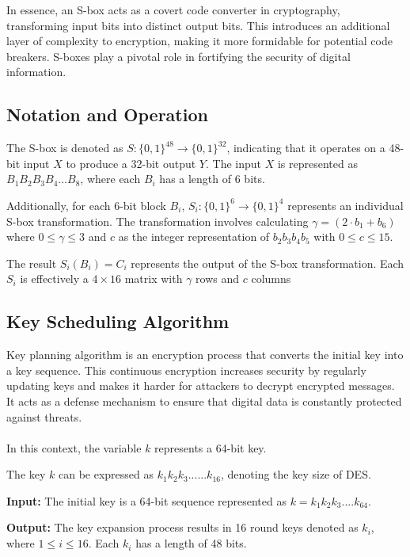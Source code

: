 \documentclass[11pt]{article}
\begin{document}
In essence, an S-box acts as a covert code converter in cryptography, transforming input bits into distinct output bits. This introduces an additional layer of complexity to encryption, making it more formidable for potential code breakers. S-boxes play a pivotal role in fortifying the security of digital information.

\subsection{Notation and Operation}

The S-box is denoted as \(S: \{0, 1\}^{48} \rightarrow \{0, 1\}^{32}\), indicating that it operates on a 48-bit input \(X\) to produce a 32-bit output \(Y\). The input \(X\) is represented as \(B_1B_2B_3B_4 \ldots B_8\), where each \(B_i\) has a length of 6 bits.

Additionally, for each 6-bit block \(B_i\), \(S_i: \{0, 1\}^6 \rightarrow \{0, 1\}^4\) represents an individual S-box transformation. The transformation involves calculating \(\gamma = (2 \cdot b_1 + b_6)\) where \(0 \leq \gamma \leq 3\) and \(c\) as the integer representation of \(b_2b_3b_4b_5\) with \(0 \leq c \leq 15\).

The result \(S_i(B_i) = C_i\) represents the output of the S-box transformation. Each \(S_i\) is effectively a \(4 \times 16\) matrix with \(\gamma\) rows and \(c\) columns

\subsection{Key Scheduling Algorithm}

Key planning algorithm is an encryption process that converts the initial key into a key sequence. This continuous encryption increases security by regularly updating keys and makes it harder for attackers to decrypt encrypted messages. It acts as a defense mechanism to ensure that digital data is constantly protected against threats.\\\\

In this context, the variable $k$ represents a 64-bit key.

The key $k$ can be expressed as $k_1 k_2 k_3......k_{16}$, denoting the key size of DES.

\textbf{Input:} The initial key is a 64-bit sequence represented as $k = k_1 k_2 k_3....k_{64}$.

\textbf{Output:} The key expansion process results in 16 round keys denoted as $k_i$, where $1 \leq i \leq 16$. Each $k_i$ has a length of 48 bits.
\end{document}
